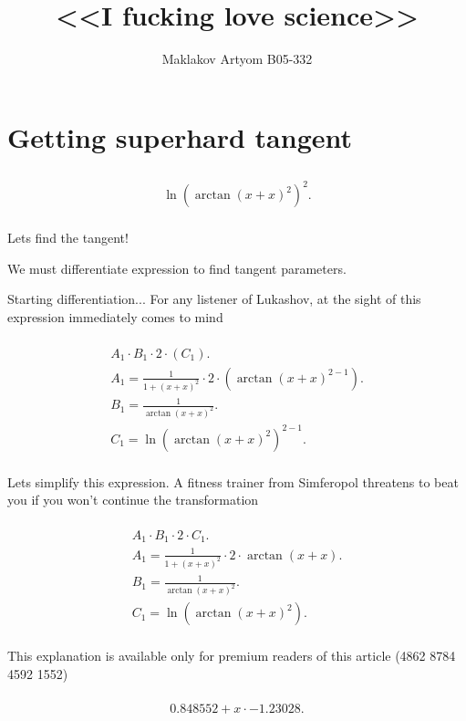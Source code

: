 \documentclass[12pt,a4paper]{extreport}
\title{<<I fucking love science>>}
\author{Maklakov Artyom B05-332}
\begin{document}
\maketitle
\tableofcontents
\section{Getting superhard tangent}


\begin{multline}
\\
\ln(\arctan(x + x) ^ {2}) ^ {2}.\\
\end{multline}


Lets find the tangent!

We must differentiate expression to find tangent parameters.

Starting differentiation... 
For any listener of Lukashov, at the sight of this expression immediately comes to mind 

\begin{multline}
\\
A_{1} \cdot B_{1} \cdot 2 \cdot (C_{1}).\\
A_{1} = \frac{1}{1 + (x + x) ^ {2}} \cdot 2 \cdot (\arctan(x + x) ^ {2 - 1}).\\
B_{1} = \frac{1}{\arctan(x + x) ^ {2}}.\\
C_{1} = \ln(\arctan(x + x) ^ {2}) ^ {2 - 1}.\\
\end{multline}


Lets simplify this expression.
A fitness trainer from Simferopol\cite{SJ} threatens to beat you if you won't continue the transformation 

\begin{multline}
\\
A_{1} \cdot B_{1} \cdot 2 \cdot C_{1}.\\
A_{1} = \frac{1}{1 + (x + x) ^ {2}} \cdot 2 \cdot \arctan(x + x).\\
B_{1} = \frac{1}{\arctan(x + x) ^ {2}}.\\
C_{1} = \ln(\arctan(x + x) ^ {2}).\\
\end{multline}

This explanation is available only for premium readers of this article (4862 8784 4592 1552) 

\begin{multline}
\\
0.848552 + x \cdot -1.23028.\\
\end{multline}
\end{document}
